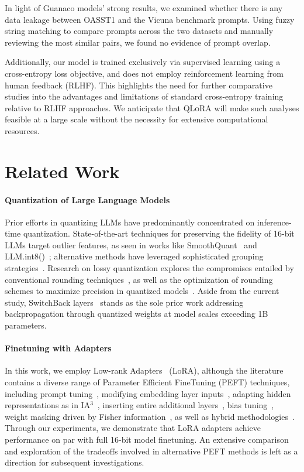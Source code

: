 In light of {Guanaco} models' strong results, we examined whether there is any data leakage between OASST1 and the Vicuna benchmark prompts. Using fuzzy string matching to compare prompts across the two datasets and manually reviewing the most similar pairs, we found no evidence of prompt overlap.

Additionally, our model is trained exclusively via supervised learning using a cross-entropy loss objective, and does not employ reinforcement learning from human feedback (RLHF). This highlights the need for further comparative studies into the advantages and limitations of standard cross-entropy training relative to RLHF approaches. We anticipate that \textsc{QLoRA} will make such analyses feasible at a large scale without the necessity for extensive computational resources.

\section{Related Work}

\paragraph{Quantization of Large Language Models} Prior efforts in quantizing LLMs have predominantly concentrated on inference-time quantization. State-of-the-art techniques for preserving the fidelity of 16-bit LLMs target outlier features, as seen in works like SmoothQuant~\citep{xiao2022smoothquant} and LLM.int8()~\citep{dettmers2022llm}; alternative methods have leveraged sophisticated grouping strategies~\citep{park2022nuqmm, yao2022zeroquant}. Research on lossy quantization explores the compromises entailed by conventional rounding techniques~\citep{dettmers2022case,zeng2022glm,pope2022efficiently}, as well as the optimization of rounding schemes to maximize precision in quantized models~\citep{frantar2022gptq}. Aside from the current study, SwitchBack layers~\citep{wortsman2023stable} stands as the sole prior work addressing backpropagation through quantized weights at model scales exceeding 1B parameters.

\paragraph{Finetuning with Adapters} In this work, we employ Low-rank Adapters~\citep{hu2021lora} (LoRA), although the literature contains a diverse range of Parameter Efficient FineTuning (PEFT) techniques, including prompt tuning~\citep{qin2021learning,lester2021power,li2021prefix}, modifying embedding layer inputs~\citep{an2022input}, adapting hidden representations as in IA$^3$~\citep{liu2022few}, inserting entire additional layers~\citep{houlsby2019parameter}, bias tuning~\citep{zaken2021bitfit}, weight masking driven by Fisher information~\citep{sung2021training}, as well as hybrid methodologies~\citep{henderson2021compacter}. Through our experiments, we demonstrate that LoRA adapters achieve performance on par with full 16-bit model finetuning. An extensive comparison and exploration of the tradeoffs involved in alternative PEFT methods is left as a direction for subsequent investigations.

